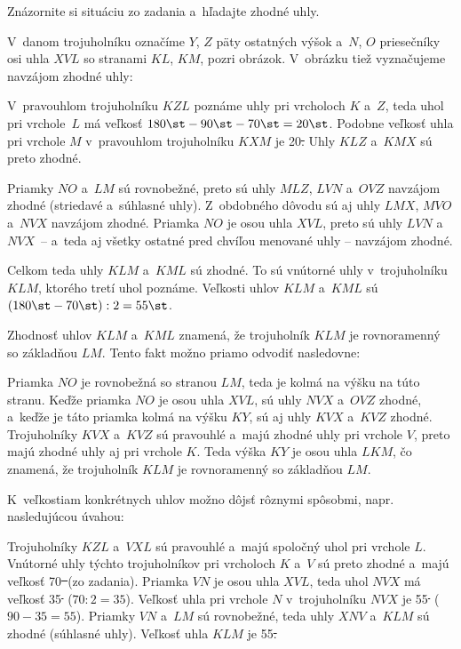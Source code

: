 {%
\napad
Znázornite si situáciu zo zadania a~hľadajte zhodné uhly.

\riesenie
V~danom trojuholníku označíme $Y$, $Z$ päty ostatných výšok a~$N$, $O$ priesečníky osi uhla $XVL$ so stranami $KL$, $KM$, pozri obrázok.
V~obrázku tiež vyznačujeme navzájom zhodné uhly:
%


V~pravouhlom trojuholníku $KZL$ poznáme uhly pri vrcholoch $K$ a~$Z$, teda uhol pri vrchole~$L$ má veľkosť $180\st-90\st-70\st=20\st$.
Podobne veľkosť uhla pri vrchole $M$ v~pravouhlom trojuholníku $KXM$ je 20\st.
Uhly $KLZ$ a~$KMX$ sú preto zhodné.

Priamky $NO$ a~$LM$ sú rovnobežné, preto sú uhly $MLZ$, $LVN$ a~$OVZ$ navzájom zhodné (striedavé a~súhlasné uhly).
Z~obdobného dôvodu sú aj uhly $LMX$, $MVO$ a~$NVX$ navzájom zhodné.
Priamka $NO$ je osou uhla $XVL$, preto sú uhly $LVN$ a~$NVX$~-- a~teda aj všetky ostatné pred chvíľou menované uhly -- navzájom zhodné.

Celkom teda uhly $KLM$ a~$KML$ sú zhodné.
To sú vnútorné uhly v~trojuholníku $KLM$, ktorého tretí uhol poznáme.
Veľkosti uhlov $KLM$ a~$KML$ sú $(180\st-70\st):2=55\st$.

\poznamky
Zhodnosť uhlov $KLM$ a~$KML$ znamená, že trojuholník $KLM$ je rovnoramenný so základňou $LM$.
Tento fakt možno priamo odvodiť nasledovne:

Priamka $NO$ je rovnobežná so stranou $LM$, teda je kolmá na výšku na túto stranu.
Keďže priamka $NO$ je osou uhla $XVL$, sú uhly $NVX$ a~$OVZ$ zhodné, a~keďže je táto priamka kolmá na výšku $KY$, sú aj uhly $KVX$ a~$KVZ$ zhodné.
Trojuholníky $KVX$ a~$KVZ$ sú pravouhlé a~majú zhodné uhly pri vrchole $V$, preto majú zhodné uhly aj pri vrchole $K$.
Teda výška $KY$ je osou uhla $LKM$, čo znamená, že trojuholník $KLM$ je rovnoramenný so základňou $LM$.

\smallskip
K~veľkostiam konkrétnych uhlov možno dôjsť rôznymi spôsobmi, napr. nasledujúcou úvahou:

Trojuholníky $KZL$ a~$VXL$ sú pravouhlé a~majú spoločný uhol pri vrchole $L$.
Vnútorné uhly týchto trojuholníkov pri vrcholoch $K$ a~$V$ sú preto zhodné a~majú veľkosť 70\st\ (zo zadania).
Priamka $VN$ je osou uhla $XVL$, teda uhol $NVX$ má veľkosť 35\st\, ($70:2=35$).
Veľkosť uhla pri vrchole $N$ v~trojuholníku $NVX$ je 55\st\, ($90-35=55$).
Priamky $VN$ a~$LM$ sú rovnobežné, teda uhly $XNV$ a~$KLM$ sú zhodné (súhlasné uhly).
Veľkosť uhla $KLM$ je 55\st.
}

